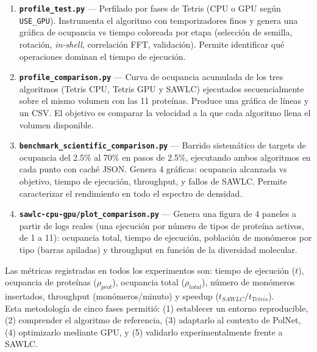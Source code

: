\begin{enumerate}
    \item \textbf{\texttt{profile\_test.py}} — Perfilado por fases de Tetris (CPU o GPU según \texttt{USE\_GPU}). Instrumenta el algoritmo con temporizadores finos y genera una gráfica de ocupancia vs tiempo coloreada por etapa (selección de semilla, rotación, \textit{in-shell}, correlación FFT, validación). Permite identificar qué operaciones dominan el tiempo de ejecución.

    \item \textbf{\texttt{profile\_comparison.py}} — Curva de ocupancia acumulada de los tres algoritmos (Tetris CPU, Tetris GPU y SAWLC) ejecutados secuencialmente sobre el mismo volumen con las 11 proteínas. Produce una gráfica de líneas y un CSV. El objetivo es comparar la velocidad a la que cada algoritmo llena el volumen disponible.

    \item \textbf{\texttt{benchmark\_scientific\_comparison.py}} — Barrido sistemático de targets de ocupancia del 2.5\% al 70\% en pasos de 2.5\%, ejecutando ambos algoritmos en cada punto con caché JSON. Genera 4 gráficas: ocupancia alcanzada vs objetivo, tiempo de ejecución, throughput, y fallos de SAWLC. Permite caracterizar el rendimiento en todo el espectro de densidad.

    \item \textbf{\texttt{sawlc-cpu-gpu/plot\_comparison.py}} — Genera una figura de 4 paneles a partir de logs reales (una ejecución por número de tipos de proteína activos, de 1 a 11): ocupancia total, tiempo de ejecución, población de monómeros por tipo (barras apiladas) y throughput en función de la diversidad molecular.
\end{enumerate}

Las métricas registradas en todos los experimentos son: tiempo de ejecución ($t$), ocupancia de proteínas ($\rho_{prot}$), ocupancia total ($\rho_{total}$), número de monómeros insertados, throughput (monómeros/minuto) y speedup ($t_{SAWLC}/t_{Tetris}$).\\

Esta metodología de cinco fases permitió: (1) establecer un entorno reproducible, (2) comprender el algoritmo de referencia, (3) adaptarlo al contexto de PolNet, (4) optimizarlo mediante GPU, y (5) validarlo experimentalmente frente a SAWLC.


